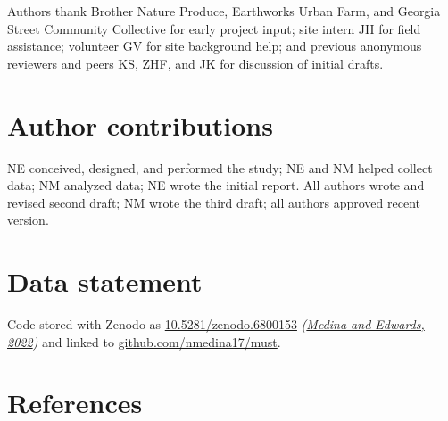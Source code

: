 \documentclass[
  12pt,
]{article}
\begin{document}
Authors thank Brother Nature Produce, Earthworks Urban Farm, and Georgia Street Community Collective for early project input; site intern JH for field assistance; volunteer GV for site background help; and previous anonymous reviewers and peers KS, ZHF, and JK for discussion of initial drafts.

\hypertarget{author-contributions}{%
\section*{Author contributions}\label{author-contributions}}

NE conceived, designed, and performed the study; NE and NM helped collect data; NM analyzed data; NE wrote the initial report. All authors wrote and revised second draft; NM wrote the third draft; all authors approved recent version.

\hypertarget{data-statement}{%
\section*{Data statement}\label{data-statement}}

Code stored with Zenodo as \href{https://doi.org/10.5281/zenodo.6800153}{10.5281/zenodo.6800153} \emph{(\protect\hyperlink{ref-softwareMedinaEdwards22}{Medina and Edwards, 2022})} and linked to \url{github.com/nmedina17/must}.

\newpage

\hypertarget{references}{%
\section*{References}\label{references}}
\end{document}
